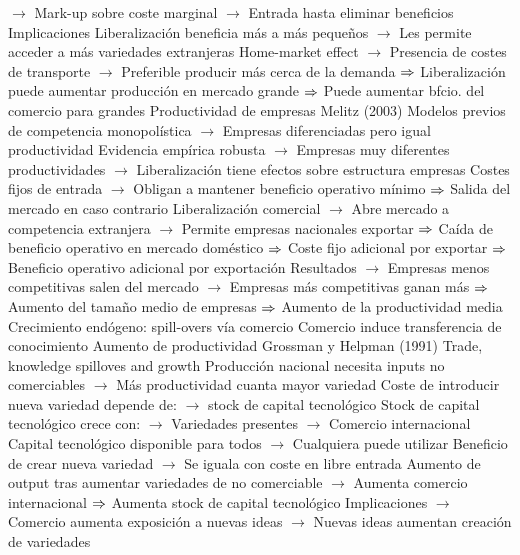 \documentclass{nuevotema}
\begin{document}
\begin{esquemal}
				\4[] $\to$ Mark-up sobre coste marginal
				\4[] $\to$ Entrada hasta eliminar beneficios
				\4 Implicaciones
				\4[] Liberalización beneficia más a más pequeños
				\4[] $\to$ Les permite acceder a más variedades extranjeras
				\4[] Home-market effect
				\4[] $\to$ Presencia de costes de transporte
				\4[] $\to$ Preferible producir más cerca de la demanda
				\4[] $\Rightarrow$ Liberalización puede aumentar producción en mercado grande
				\4[] $\Rightarrow$ Puede aumentar bfcio. del comercio para grandes
			\3 Productividad de empresas
				\4 Melitz (2003)
				\4[] Modelos previos de competencia monopolística
				\4[] $\to$ Empresas diferenciadas pero igual productividad
				\4[] Evidencia empírica robusta
				\4[] $\to$ Empresas muy diferentes productividades
				\4[] $\to$ Liberalización tiene efectos sobre estructura empresas
				\4[] Costes fijos de entrada
				\4[] $\to$ Obligan a mantener beneficio operativo mínimo
				\4[] $\Rightarrow$ Salida del mercado en caso contrario
				\4[] Liberalización comercial
				\4[] $\to$ Abre mercado a competencia extranjera
				\4[] $\to$ Permite empresas nacionales exportar
				\4[] $\Rightarrow$ Caída de beneficio operativo en mercado doméstico
				\4[] $\Rightarrow$ Coste fijo adicional por exportar
				\4[] $\Rightarrow$ Beneficio operativo adicional por exportación
				\4[] Resultados
				\4[] $\to$ Empresas menos competitivas salen del mercado
				\4[] $\to$ Empresas más competitivas ganan más
				\4[] $\Rightarrow$ Aumento del tamaño medio de empresas
				\4[] $\Rightarrow$ Aumento de la productividad media
			\3 Crecimiento endógeno: spill-overs vía comercio
				\4 Comercio induce transferencia de conocimiento
				\4[] Aumento de productividad
				\4 Grossman y Helpman (1991)
				\4[] Trade, knowledge spilloves and growth
				\4[] Producción nacional necesita inputs no comerciables
				\4[] $\to$ Más productividad cuanta mayor variedad
				\4[] Coste de introducir nueva variedad depende de:
				\4[] $\to$ stock de capital tecnológico
				\4[] Stock de capital tecnológico crece con:
				\4[] $\to$ Variedades presentes
				\4[] $\to$ Comercio internacional
				\4[] Capital tecnológico disponible para todos
				\4[] $\to$ Cualquiera puede utilizar
				\4[] Beneficio de crear nueva variedad
				\4[] $\to$ Se iguala con coste en libre entrada
				\4[] Aumento de output tras aumentar variedades de no comerciable
				\4[] $\to$ Aumenta comercio internacional
				\4[] $\Rightarrow$ Aumenta stock de capital tecnológico
				\4[] Implicaciones
				\4[] $\to$ Comercio aumenta exposición a nuevas ideas
				\4[] $\to$ Nuevas ideas aumentan creación de variedades

\end{esquemal}
\end{document}
